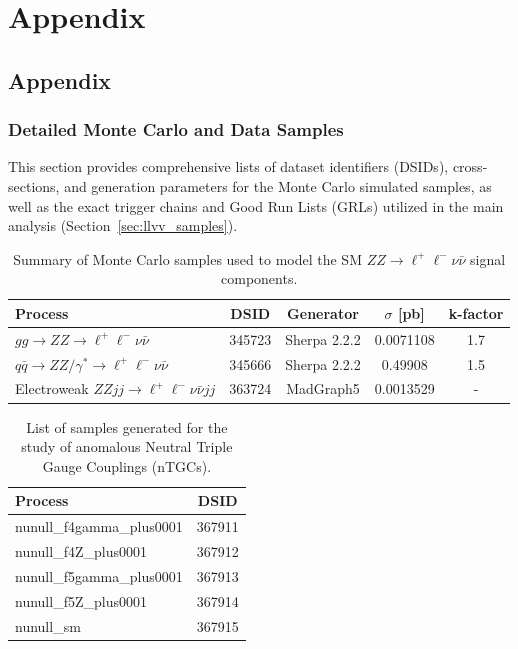 
\chapter{Appendix}

\section{Appendix}

\subsection{Detailed Monte Carlo and Data Samples}
\label{subsec:samples_zz}

This section provides comprehensive lists of dataset identifiers (DSIDs), cross-sections, and generation parameters for the Monte Carlo simulated samples, as well as the exact trigger chains and Good Run Lists (GRLs) utilized in the main analysis (Section~\ref{sec:llvv_samples}).

\begin{table}[htbp]
\centering
\scriptsize
\begin{tabularx}{400pt}{|X||c|c|c|c|}
\hline
\centering \textbf{Process} & \textbf{DSID} & \textbf{Generator} & \textbf{$\sigma$ [pb]} & \textbf{k-factor}\\
\hline
\centering $gg\rightarrow ZZ \to \ell^+\ell^-\nu\bar{\nu}$ & 345723 & Sherpa 2.2.2 & 0.0071108 & 1.7 \\ \hline
\centering $q\bar{q}\rightarrow ZZ/\gamma^* \to \ell^+\ell^-\nu\bar{\nu}$ & 345666 & Sherpa 2.2.2 & 0.49908 & 1.5 \\ \hline
\centering Electroweak $ZZjj \to \ell^+\ell^-\nu\bar{\nu}jj$ & 363724 &  MadGraph5 & 0.0013529 & - \\ \hline
\end{tabularx}
\caption{\rm Summary of Monte Carlo samples used to model the SM $ZZ \to \ell^+\ell^-\nu\bar{\nu}$ signal components.}
\label{tab:ZZ_signal_samples}
\end{table}

\begin{table}[htbp]
\centering
\scriptsize
\begin{tabularx}{400pt}{|X|c|}
\hline
\centering \textbf{Process} & \textbf{DSID} \\
\hline
nunull\_f4gamma\_plus0001 & 367911 \\ \hline
nunull\_f4Z\_plus0001 & 367912 \\ \hline
nunull\_f5gamma\_plus0001 & 367913 \\ \hline
nunull\_f5Z\_plus0001 & 367914 \\ \hline
nunull\_sm & 367915 \\ \hline
\end{tabularx}
\caption{\rm List of samples generated for the study of anomalous Neutral Triple Gauge Couplings (nTGCs).}
\label{tab:ZZEFTsamples}
\end{table}

